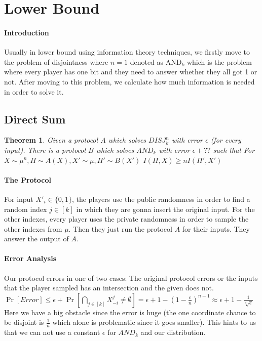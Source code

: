 \documentclass{article}
\theoremstyle{plain}
\newtheorem{theorem}{Theorem}[section]
\begin{document}
\section{Lower Bound}
\paragraph{Introduction}
Usually in lower bound using information theory techniques, we firstly move to the problem of disjointness where $n=1$ denoted as $\text{AND}_k$ which is the problem where every player has one bit and they need to answer whether they all got 1 or not. After moving to this problem, we calculate how much information is needed in order to solve it.
\subsection{Direct Sum}
\begin{theorem}
Given a protocol $A$ which solves $DISJ^n_k$ with error $\epsilon$ (for every input). There is a protocol $B$ which solves $AND_k$ with error $\epsilon + ??$ such that \newline
For $X \sim \mu^n, \Pi \sim A(X), X' \sim \mu, \Pi ' \sim B(X') $ \newline
$I(\Pi, X) \geq n I(\Pi ', X')$
\end{theorem}
\paragraph{The Protocol}
For input $X'_i \in \{0, 1\}$, the players use the public randomness in order to find a random index $j \in [k]$ in which they are gonna insert the original input. For the other indexes, every player uses the private randomness in order to sample the other indexes from $\mu$. Then they just run the protocol $A$ for their inputs. They answer the output of $A$. 

\paragraph{Error Analysis}
Our protocol errors in one of two cases: The original protocol errors or the inputs that the player sampled has an intersection and the given does not. \newline
$\Pr[Error] \leq \epsilon + \Pr[\underset{j \in [k]}{\bigcap } X^j_{-i} \neq \emptyset] = \epsilon + 1 - (1 - \frac{c}{n})^{n-1} \approx \epsilon + 1 - \frac{1}{\sqrt[c]{e}}$ \newline
Here we have a big obstacle since the error is huge (the one coordinate chance to be disjoint is $\frac{1}{n}$ which alone is problematic since it goes smaller). This hints to us that we can not use a constant $\epsilon$ for $AND_k$ and our distribution.
\end{document}
